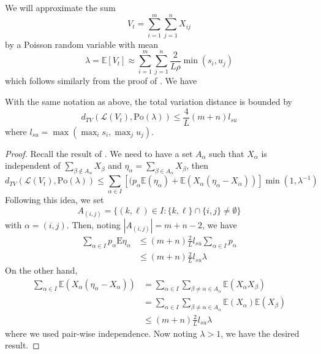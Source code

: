 \documentclass{article}
\begin{document}
We will approximate the sum 
\begin{equation*}
    V_{t} = \sum_{i=1}^{m}\sum_{j=1}^{n}X_{ij}
\end{equation*}
by a Poisson random variable with mean 
\begin{equation*}
    \lambda = \mathbb{E}[V_t] \approx \sum_{i=1}^{m}\sum_{j=1}^{n}\frac{2}{L\rho} \min(s_i, u_j)
\end{equation*}
which follows similarly from the proof of . We have
\begin{theorem}
    With the same notation as above, the total variation distance is bounded by 
    \begin{equation*}
        d_{TV}(\mathcal{L}(V_t), \mathrm{Po}(\lambda)) \leq \frac{4}{L}(m+n) l_{su}
    \end{equation*}
    where $l_{su} = \max(\max_i s_i, \max_j u_j)$.  
\end{theorem}

\begin{proof}
    Recall the result of . We need to have a set $A_\alpha$ such that $X_\alpha$ is independent of $\sum_{\beta\notin A_\alpha}X_\beta$ and $\eta_\alpha = \sum_{\beta \in A_\alpha}X_\beta$, then
    \begin{equation*}
        d_{TV}(\mathcal{L}(V_t), \text{Po}(\lambda)) \leq \sum_{\alpha\in I}[(p_{\alpha}\mathbb{E}(\eta_{\alpha})+\mathbb{E}(X_{\alpha}(\eta_{\alpha}-X_{\alpha}))]\operatorname*{min}\left(1,\lambda^{-1}\right)
    \end{equation*}
    Following this idea, we set 
    \begin{equation*}
        A_{(i,j)}=\{(k,\ell)\in I:\{k,\ell\}\cap\{i,j\}\neq\emptyset\}
    \end{equation*}
    with $\alpha = (i,j)$. Then, noting $|A_{(i,j)}| = m+n-2$, we have
    \begin{align*}
        \sum_{\alpha\in I}p_{\alpha}\mathrm{E}\eta_{\alpha} &\leq(m+n){\frac{2}{L}}l_{s u}\sum_{\alpha\in I}p_{\alpha} \\
        &\leq(m+n){\frac{2}{L}}l_{s u}\lambda
    \end{align*}
    On the other hand,
    \begin{align*}
        \sum_{\alpha\in I}\mathbb{E}(X_{\alpha}(\eta_{\alpha}-X_{\alpha})) &= \sum_{\alpha\in I} \sum_{\beta\neq \alpha \in A_\alpha} \mathbb{E}(X_{\alpha}X_{\beta}) \\
        &= \sum_{\alpha\in I} \sum_{\beta\neq \alpha \in A_\alpha} \mathbb{E}(X_{\alpha})\mathbb{E}(X_{\beta}) \\
        &\leq(m+n){\frac{2}{L}}l_{s u}\lambda
    \end{align*}
    where we used pair-wise independence. Now noting $\lambda>1$, we have the desired result.
\end{proof}
\end{document}
